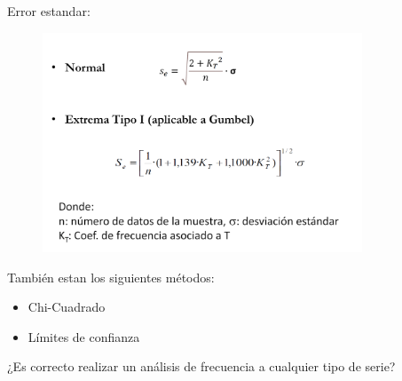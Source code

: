 Error estandar:

\begin{figure}[H]
    \centering
    \includegraphics[width=0.85\textwidth]{imagenes/error_estandar.png}
    \label{fig:error_estandar}
\end{figure}

También estan los siguientes métodos:

\begin{itemize}
    \item Chi-Cuadrado
    \item Límites de confianza
\end{itemize}

¿Es correcto realizar un análisis de frecuencia a cualquier tipo de serie?

